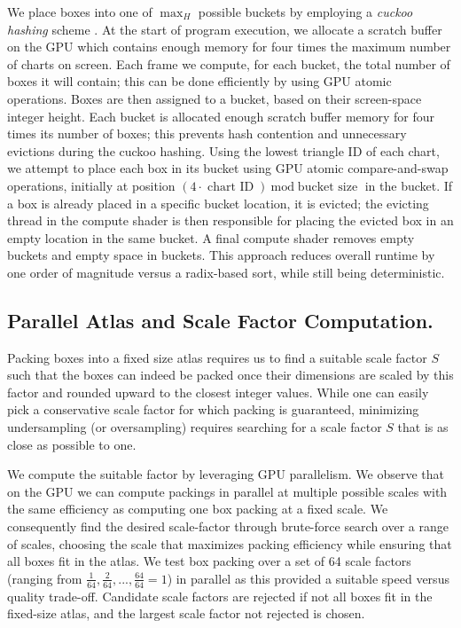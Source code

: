 We place boxes into one of $\max_H$ possible buckets by employing a {\em cuckoo hashing} scheme \cite{pagh2004cuckoo}. At the start of program execution, we allocate a scratch buffer on the GPU which contains enough memory for four times the maximum number of charts on screen. Each frame we compute, for each bucket, the total number of boxes it will contain; this can be done efficiently by using GPU atomic operations. Boxes are then assigned to a bucket, based on their screen-space integer height. Each bucket is allocated enough scratch buffer memory for four times its number of boxes; this prevents hash contention and unnecessary evictions during the cuckoo hashing. Using the lowest triangle ID of each chart, we attempt to place each box in its bucket using GPU atomic compare-and-swap operations, initially at position $(4 \cdot \operatorname{chart\ ID})\ \mathrm{mod}\operatorname{bucket\ size}$ in the bucket. If a box is already placed in a specific bucket location, it is evicted; the evicting thread in the compute shader is then responsible for placing the evicted box in an empty location in the same bucket. A final compute shader removes empty buckets and empty space in buckets. This approach reduces overall runtime by one order of magnitude versus a radix-based sort, while still being deterministic. 

\subsection{Parallel Atlas and Scale Factor Computation.}
\label{sec:scale}
Packing boxes into a fixed size atlas requires us to find a suitable scale factor $S$ such that the boxes can indeed be packed once their dimensions are scaled by this factor and rounded upward to the closest integer values. While one can easily pick a conservative scale factor for which packing is guaranteed, minimizing undersampling (or oversampling) requires searching for a scale factor $S$ that is as close as possible to one.

We compute the suitable factor by leveraging GPU parallelism. We observe that on the GPU we can compute packings in parallel at multiple possible scales with the same efficiency as computing one box packing at a fixed scale. 
We consequently find the desired scale-factor through brute-force search over a range of scales, choosing the scale that maximizes packing efficiency while ensuring that all boxes fit in the atlas. We test box packing over a set of 64 scale factors (ranging from $\frac{1}{64}, \frac{2}{64}, ..., \frac{64}{64}=1$) in parallel as this provided a suitable speed versus quality trade-off.
Candidate scale factors are rejected if not all boxes fit in the fixed-size atlas, and the largest scale factor not rejected is chosen.

